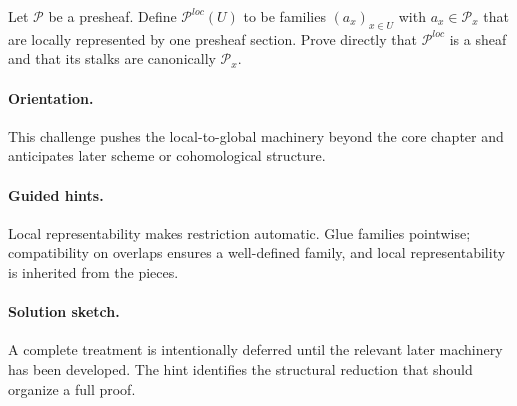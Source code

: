 \begin{problem}
Let $\mathcal P$ be a presheaf. Define $\mathcal P^{loc}(U)$ to be families $(a_x)_{x\in U}$ with $a_x\in\mathcal P_x$ that are locally represented by one presheaf section. Prove directly that $\mathcal P^{loc}$ is a sheaf and that its stalks are canonically $\mathcal P_x$.
\end{problem}

\ifdefined\FullProblemDossiers
\paragraph{Orientation.}
This challenge pushes the local-to-global machinery beyond the core chapter and anticipates later scheme or cohomological structure.

\paragraph{Guided hints.}
Local representability makes restriction automatic. Glue families pointwise; compatibility on overlaps ensures a well-defined family, and local representability is inherited from the pieces.

\paragraph{Solution sketch.}
A complete treatment is intentionally deferred until the relevant later machinery has been developed. The hint identifies the structural reduction that should organize a full proof.
\fi
